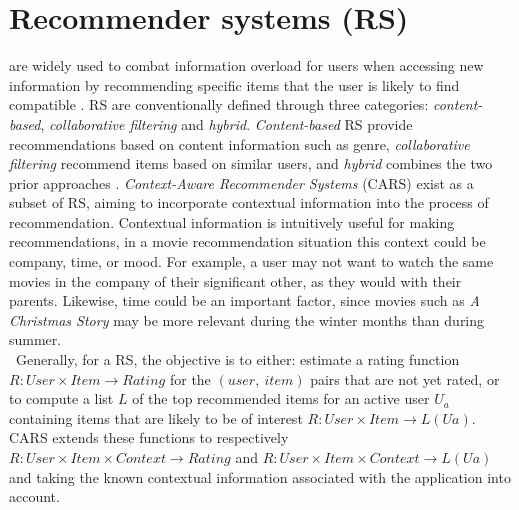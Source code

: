 \chapter{Recommender systems (RS)}\label{ch:introduction}
are widely used to combat information overload for users when accessing new information by recommending specific items that the user is likely to find compatible \cite{YouTubeNeural,IndustryPerspective}.
RS are conventionally defined through three categories: \textit{content-based}, \textit{collaborative filtering} and \textit{hybrid}.
\textit{Content-based} RS provide recommendations based on content information such as genre, \textit{collaborative filtering} recommend items based on similar users, and \textit{hybrid} combines the two prior approaches \cite{ContextSurvey2020}.
\textit{Context-Aware Recommender Systems} (CARS) exist as a subset of RS, aiming to incorporate contextual information into the process of recommendation.
Contextual information is intuitively useful for making recommendations, in a movie recommendation situation this context could be company, time, or mood.
For example, a user may not want to watch the same movies in the company of their significant other, as they would with their parents.
Likewise, time could be an important factor, since movies such as \textit{A Christmas Story} may be more relevant during the winter months than during summer.\\\
Generally, for a RS, the objective is to either: estimate a rating function $R: User \times Item \rightarrow Rating$ for the $(user, \ item)$ pairs that are not yet rated, or to compute a list $L$ of the top recommended items for an active user $U_a$ containing items that are likely to be of interest $R: User \times Item \rightarrow L(Ua)$\cite{RecommenderHandbook2015}.
CARS extends these functions to respectively $R: User \times Item \times Context \rightarrow Rating$ and $R: User \times Item \times Context \rightarrow L(Ua)$ and  taking the known contextual information associated with the application into account.
